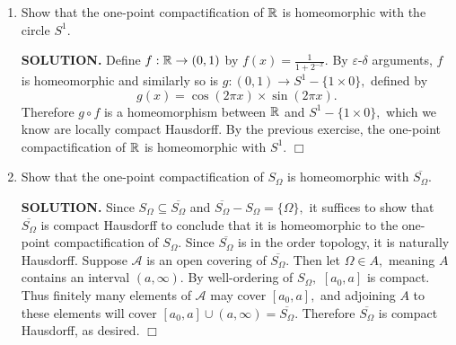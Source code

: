 \documentclass{article}
\begin{document}
\begin{enumerate}
    {\bf SOLUTION.} Let $Y_1 = X_1 \cup \{\infty_1\}, Y_2 = X_2 \cup \{\infty_2\}$ be the one-point compactifications of $X_1, X_2.$ Define $g: Y_1 \rightarrow Y_2$ by
    $$g(x) = \begin{cases}
        f(x) &\text{if } x \in X_1, \\
        \infty_2 &\text{if } x = \infty_1.
    \end{cases}$$
    $g$ is obviously bijective. Let $U$ be open in $Y_1.$ If $U$ is open in $X_1$ then $g(U) = f(U)$ is open in $X_2,$ and thus $Y_2,$ since $f$ is homeomorphic. Otherwise if $U$ is in the form $X_1-C$ where $C$ is compact in $X_1,$ then $g(U) = g(Y_1) - g(C) = Y_2 - g(C)$ is open in $Y_2$ because $g(C) = f(C)$ is compact in $X_2.$ We have shown that $g$ is an open map; by symmetry it is a homeomorphism. $\Box$
    
    \item Show that the one-point compactification of $\mathbb{R}$ is homeomorphic with the circle $S^1.$

    {\bf SOLUTION.} Define $f: \mathbb{R} \rightarrow (0, 1)$ by $f(x) = \frac{1}{1+2^{-x}}.$ By $\varepsilon$-$\delta$ arguments, $f$ is homeomorphic and similarly so is $g: (0, 1) \rightarrow S^1 - \{1 \times 0\},$ defined by
    $$g(x) = \cos (2\pi x) \times \sin(2\pi x).$$
    Therefore $g \circ f$ is a homeomorphism between $\mathbb{R}$ and $S^1 - \{1 \times 0\},$ which we know are locally compact Hausdorff. By the previous exercise, the one-point compactification of $\mathbb{R}$ is homeomorphic with $S^1.$ $\Box$

    \item Show that the one-point compactification of $S_\Omega$ is homeomorphic with $\overline{S_\Omega}.$

    {\bf SOLUTION.} Since $S_\Omega \subseteq \overline{S_\Omega}$ and $\overline{S_\Omega} - S_\Omega = \{\Omega\},$ it suffices to show that $\overline{S_\Omega}$ is compact Hausdorff to conclude that it is homeomorphic to the one-point compactification of $S_\Omega.$ Since $\overline{S_\Omega}$ is in the order topology, it is naturally Hausdorff. Suppose $\mathcal{A}$ is an open covering of $\overline{S_\Omega}.$ Then let $\Omega \in A,$ meaning $A$ contains an interval $(a, \infty).$ By well-ordering of $S_\Omega,$ $[a_0, a]$ is compact. Thus finitely many elements of $\mathcal{A}$ may cover $[a_0, a],$ and adjoining $A$ to these elements will cover $[a_0, a] \cup (a, \infty) = \overline{S_\Omega}$. Therefore $\overline{S_\Omega}$ is compact Hausdorff, as desired. $\Box$


\end{enumerate}
\end{document}
